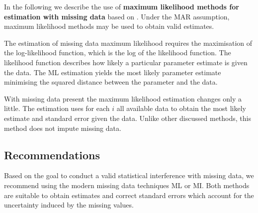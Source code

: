 In the following we describe the use of \textbf{maximum likelihood methods for estimation with missing data} based on \cite{Enders06}. 
Under the MAR assumption, maximum likelihood methods may be used to obtain valid estimates. \par
The estimation of missing data maximum likelihood requires the maximisation of the log-likelihood function, which is the log of the likelihood function. The likelihood function describes how likely a particular parameter estimate is given the data. The ML estimation yields the most likely parameter estimate minimising the squared distance between the parameter and the data. \par With missing data present the maximum likelihood estimation changes only a little. The estimation uses for each $i$ all available data to obtain the most likely estimate and standard error given the data. Unlike other discussed methods, this method does not impute missing data. 

\subsection{Recommendations}
Based on the goal to conduct a valid statistical interference with missing data, we recommend using the modern missing data techniques ML or MI. Both methods are suitable to obtain estimates and correct standard errors which account for the uncertainty induced by the missing values.
